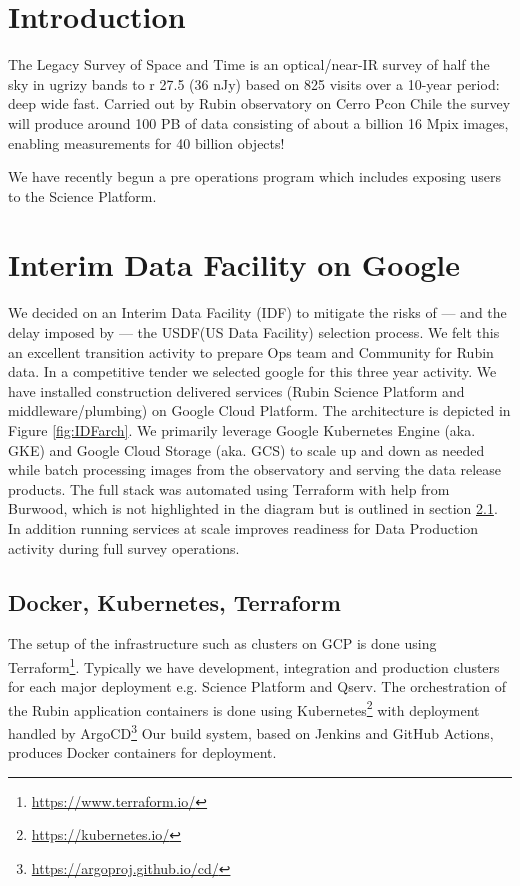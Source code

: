 \section{Introduction}

The Legacy Survey of Space and Time is an optical/near-IR survey of half the sky in ugrizy bands to r 27.5 (36 nJy) based on 825 visits over a 10-year period: deep wide fast.
Carried out by Rubin observatory on Cerro Pcon Chile the survey will produce around 100 PB of data consisting of about a billion 16 Mpix images, enabling measurements for 40 billion objects! \cite{arXiv:0805.2366}

We have recently begun a pre operations program which includes exposing users to the Science Platform.


\section{Interim Data Facility on Google }
We decided on an Interim Data Facility (IDF) to mitigate the risks of — and the delay imposed by — the USDF(US Data Facility)  selection process.
We felt this an excellent transition activity to prepare Ops team and Community for Rubin data.
In a competitive tender we selected google for this three year activity.
We have installed construction delivered services (Rubin Science Platform and middleware/plumbing) on Google Cloud Platform.
The architecture is depicted in Figure \ref{fig:IDFarch}.
We primarily leverage Google Kubernetes Engine (aka. GKE) and Google Cloud Storage (aka. GCS) to scale up and down as needed while batch processing images from the observatory and serving the data release products.
The full stack was automated using Terraform with help from Burwood, which is not highlighted in the diagram but is outlined in section \ref{sec:infra}.
In addition running services at scale improves readiness for Data Production activity during full survey operations.







\subsection{ Docker, Kubernetes, Terraform} \label{sec:infra}
The setup of the infrastructure such as clusters on GCP is done using Terraform\footnote{\url{https://www.terraform.io/}}.
Typically we have development, integration and production clusters for each major deployment e.g. Science Platform and Qserv.
The orchestration of the Rubin application containers is done using Kubernetes\footnote{\url{https://kubernetes.io/}} with deployment handled by ArgoCD\footnote{\url{https://argoproj.github.io/cd/}}
Our build system, based on Jenkins and GitHub Actions,  produces Docker containers for deployment.

